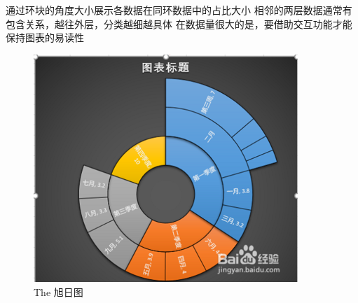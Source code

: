 \documentclass{article}
\begin{document}
\begin{itemize}
    		通过环块的角度大小展示各数据在同环数据中的占比大小
    		相邻的两层数据通常有包含关系，越往外层，分类越细越具体
    		在数据量很大的是，要借助交互功能才能保持图表的易读性\par
    		\begin{figure}[h!]
    			\centering
    			\includegraphics[scale=0.7]{xu}
    			\caption{The 旭日图}
    			\label{fig:xu}
    		\end{figure}
    

\end{itemize}
\end{document}

